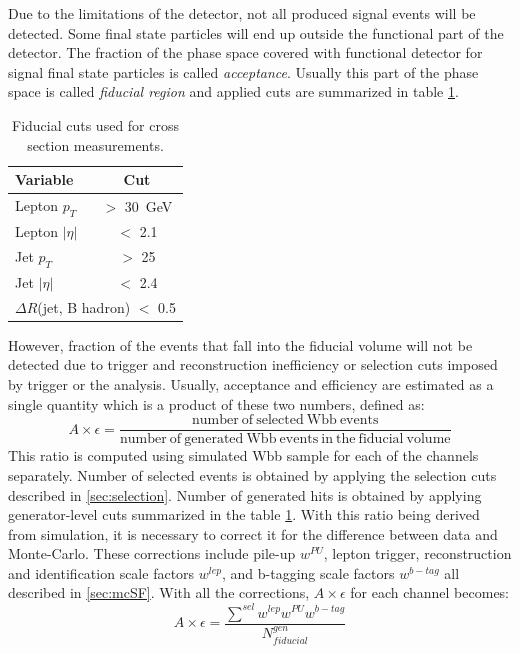Due to the limitations of the detector, not all produced signal events will be detected. Some final state particles will end up outside the functional part of the detector. The fraction of the phase space covered with functional detector for signal final state particles is called \textit{acceptance}. Usually this part of the phase space is called \textit{fiducial region} and applied cuts are summarized in table \ref{tab:fiducial}.             
\begin{table}[!htb]
\begin{center}
   \begin{tabular} {l c} \hline \hline
        Variable         & Cut \\
        \hline
        Lepton $p_T$    & $>$ 30\ GeV \\
        Lepton $|\eta|$   & $<$ 2.1 \\
        Jet $p_T$       & $>$ 25  \\
        Jet $|\eta|$      & $<$ 2.4 \\
        \multicolumn{2}{l}{
        $\Delta R$(jet, B hadron) $<$ 0.5} \\
        \hline\hline
   \end{tabular}
\caption{Fiducial cuts used for cross section measurements.}
\label{tab:fiducial}
\end{center}
\end{table}
However, fraction of the events that fall into the fiducial volume will not be detected due to trigger and reconstruction inefficiency or selection cuts imposed by trigger or the analysis. Usually, acceptance and efficiency are estimated as a single quantity which is a product of these two numbers, defined as:
\begin{equation}
A\times \epsilon=\frac{\mathrm{number\ of\ selected\ Wbb\ events}}{\mathrm{number\ of\ generated\ Wbb\ events\ in\ the\ fiducial\ volume}}
\end{equation}
This ratio is computed using simulated Wbb sample for each of the channels separately. Number of selected events is obtained by applying the selection cuts described in \ref{sec:selection}. Number of generated hits is obtained by applying generator-level cuts summarized in the table \ref{tab:fiducial}. With this ratio being derived from simulation, it is necessary to correct it for the difference between data and Monte-Carlo. These corrections include pile-up  $w^{PU}$, lepton trigger, reconstruction and identification scale factors $w^{lep}$, and b-tagging scale factors $w^{b-tag}$ all described in \ref{sec:mcSF}. With all the corrections, $A\times \epsilon$ for each channel becomes:
\begin{equation}
A\times \epsilon = \frac{\sum^{sel} w^{lep} w^{PU} w^{b-tag}}{N_{fiducial}^{gen}}
\end{equation}

